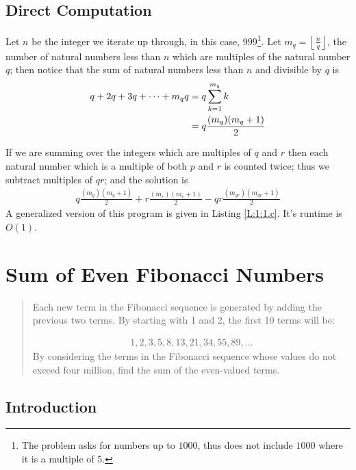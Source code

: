 \documentclass[oneside,12pt]{book}   	%
\newcounter{ex}
\newcounter{pr}
\theoremstyle{definition}
\newcommand{\floor}[1]{\left\lfloor #1 \right\rfloor}
\begin{document}
\begin{spacing}{1.618}
		\section{Direct Computation}

			Let $n$ be the integer we iterate up through, in this case, $999$\footnote{The problem asks for numbers up to $1000$, thus does not include $1000$ where it is a multiple of $5$.}. Let $m_q=\floor{\frac{n}{q}}$, the number of natural numbers less than $n$ which are multiples of the natural number $q$; then notice that the sum of natural numbers less than $n$ and divisible by $q$ is  
			\begin{alignat}{4}
				q+2q+3q+\dots+m_q q&=q\sum_{k=1}^{m_q}k \notag \\
					&=q\frac{(m_q)(m_q+1)}{2}
			\end{alignat}
			
			If we are summing over the integers which are multiples of $q$ and $r$ then each natural number which is a multiple of both $p$ and $r$ is counted twice; thus we subtract multiples of $qr$; and the solution is 
			\begin{alignat}{4}
				q\frac{(m_q)(m_q+1)}{2}+r\frac{(m_r)(m_r+1)}{2}-qr\frac{(m_{qr})(m_{qr}+1)}{2}
			\end{alignat}
			A generalized version of this program is given in Listing \ref{L:1:1.c}. It's runtime is $O(1)$. 
			
			 

	\chapter{Sum of Even Fibonacci Numbers}
		\begin{quote}
			Each new term in the Fibonacci sequence is generated by adding the previous two terms. By starting with 1 and 2, the first 10 terms will be:

			\begin{alignat*}{4}
				1, 2, 3, 5, 8, 13, 21, 34, 55, 89, \dots
			\end{alignat*}
			By considering the terms in the Fibonacci sequence whose values do not exceed four million, find the sum of the even-valued terms.
		\end{quote}

		\section{Introduction}
		

\end{spacing}
\end{document}
